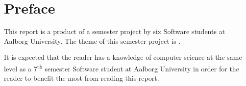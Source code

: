\chapter*{Preface}
This report is a product of a semester project by six Software students at Aalborg University. The theme of this semester project is \projecttheme.

It is expected that the reader has a knowledge of computer science at the same level as a 7\textsuperscript{th} semester Software student at Aalborg University in order for the reader to benefit the most from reading this report.